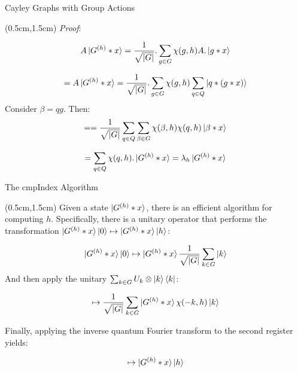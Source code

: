 \documentclass{beamer}
\theoremstyle{definition}
\begin{document}
\begin{frame}{Cayley Graphs with Group Actions}
    
    \begin{textblock*}{12cm}(0.5cm,1.5cm)
        \textit{Proof}:

        \[
        A\ket{G^{(h)}*x} = \frac{1}{\sqrt{|G|}}.\sum_{g \in G}\chi(g,h) A.\ket{g*x}
        \]

        \[
        = A\ket{G^{(h)}*x} = \frac{1}{\sqrt{|G|}}.\sum_{g \in G}\chi(g,h)\sum_{q \in Q}\ket{q*(g*x)}
        \]
        Consider $\beta = qg$. Then:
        \[
        = = \frac{1}{\sqrt{|G|}}\sum_{q \in Q}\sum_{\beta \in G}\chi(\beta,h)\chi(q,h)\ket{\beta * x}
        \]

        \[
        = \sum_{q \in Q}\chi(q,h).\ket{G^{(h)}*x} = \lambda_h \ket{G^{(h)}*x}
        \]

    \end{textblock*}

\end{frame}






\begin{frame}{The cmpIndex Algorithm}
    
    \begin{textblock*}{12cm}(0.5cm,1.5cm)
        Given a state $\ket{G^{(h)} * x}$, there is an efficient algorithm for computing $h$.
        Specifically, there is a unitary operator that performs the transformation $\ket{G^{(h)} * x} \ket{0} \mapsto \ket{G^{(h)} * x} \ket{h}$:

        \[
        \ket{G^{(h)} * x}\ket{0} \mapsto \ket{G^{(h)} * x} \frac{1}{\sqrt{|G|}}\sum_{k \in G}\ket{k}
        \]
        And then apply the unitary $\sum_{k \in G}U_k \otimes \ket{k}\bra{k}$:

        \[
        \mapsto \frac{1}{\sqrt{|G|}}\sum_{k \in G}\ket{G^{(h)}*x}\chi(-k,h)\ket{k}
        \]

       
        Finally, applying the inverse quantum Fourier transform to the second register yields:
       

        \[
           \mapsto  \ket{G^{(h)}*x}\ket{h}
        \]
    \end{textblock*}

\end{frame}
\end{document}
